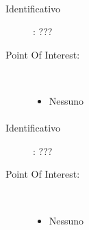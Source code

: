 \documentclass[../SperimentazioniPratiche.tex]{subfiles}
\begin{document}
			\paragraph*{}
			\label{01005}
			\begin{tcolorbox}[fonttitle=\bfseries, 
								adjusted title={\Large Beacon 01005},
								sharp corners=south,
								colback=white, 
								colframe=white!50!blue!75!black]
								
				\begin{description}
					\item[Identificativo]: ???

					\tcbline					
					
					\item[Point Of Interest:] \ \par
					\begin{itemize}
						\item Nessuno
					\end{itemize}					   				
				\end{description}  				
			\end{tcolorbox}
			
			\paragraph*{}
			\label{01006}
			\begin{tcolorbox}[fonttitle=\bfseries, 
								adjusted title={\Large Beacon 01006},
								sharp corners=south,
								colback=white, 
								colframe=white!50!blue!75!black]
								
				\begin{description}
					\item[Identificativo]: ???

					\tcbline					
					
					\item[Point Of Interest:] \ \par
					\begin{itemize}
						\item Nessuno
					\end{itemize}					   				
				\end{description}  				
			\end{tcolorbox}
			
\end{document}
